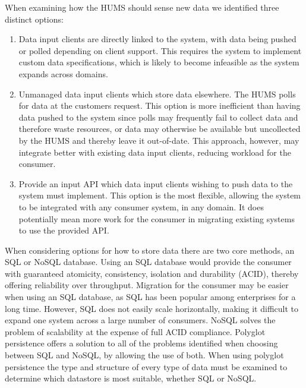 \documentclass[10pt,a4paper]{article}
\begin{document}
When examining how the HUMS should sense new data we identified three distinct
options:
\begin{enumerate}
	\item Data input clients are directly linked to the system, with data being
	      pushed or polled depending on client support. This requires the system
	      to implement custom data specifications, which is likely to become
	      infeasible as the system expands across domains.
	\item Unmanaged data input clients which store data elsewhere. The HUMS polls
	      for data at the customers request. This option is more
	      inefficient than having data pushed to the system since polls may
	      frequently fail to collect data and therefore waste resources, or data
	      may otherwise be available but uncollected by the HUMS and thereby
	      leave it out-of-date. This approach, however, may integrate better with 
	      existing data input clients, reducing workload for the consumer.
	\item Provide an input API which data input clients wishing to push data to
	      the system must implement. This option is the most flexible, allowing
	      the system to be integrated with any consumer system, in any domain. It
	      does potentially mean more work for the consumer in migrating existing
	      systems to use the provided API. 
\end{enumerate} 
When considering options for how to store data there are two core methods, an
SQL or NoSQL database. Using an SQL database would provide the consumer with
guaranteed atomicity, consistency, isolation and durability (ACID), thereby
offering reliability over throughput. Migration for the consumer may be easier
when using an SQL database, as SQL has been popular among enterprises for a long
time. However, SQL does not easily scale horizontally, making it difficult to
expand one system across a large number of consumers. NoSQL solves the problem
of scalability at the expense of full ACID compliance. Polyglot persistence offers a
solution to all of the problems identified when choosing between SQL and NoSQL,
by allowing the use of both. When using polyglot persistence the type and
structure of every type of data must be examined to determine which datastore is
most suitable, whether SQL or NoSQL.
\end{document}
